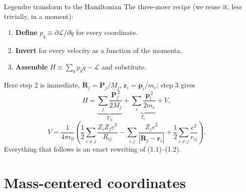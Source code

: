 \documentclass[aspectratio=169,10pt]{beamer}
\newcommand{\stagenum}{0}
\newcommand{\setstage}[1]{\renewcommand{\stagenum}{#1}}
\begin{document}
\begin{frame}{Legendre transform to the Hamiltonian}
\setstage{1}
The three-move recipe (we reuse it, less trivially, in a moment):
\begin{enumerate}
  \item \textbf{Define} $p_q\equiv\partial \mathcal L/\partial\dot q$ for every coordinate.
  \item \textbf{Invert} for every velocity as a function of the momenta.
  \item \textbf{Assemble} $H\equiv\sum_qp_q\dot q-\mathcal L$ and substitute.
\end{enumerate}
Here step 2 is immediate, $\dot{\mathbf R}_j=\mathbf P_j/M_j$, $\dot{\mathbf r}_i=\mathbf p_i/m_e$; step 3 gives
\begin{equation*}
H = \underbrace{\sum_{j}\frac{\mathbf{P}_j^{\,2}}{2M_j}}_{T_N} + \underbrace{\sum_{i}\frac{\mathbf{p}_i^{\,2}}{2m_e}}_{T_e} + V, \tag{1.1}
\end{equation*}
\begin{equation*}
V = \frac{1}{4\pi\epsilon_0}\left(\frac12\sum_{i\ne j}\frac{Z_i Z_j e^2}{R_{ij}} - \sum_{i,j}\frac{Z_j e^2}{|\mathbf{R}_j-\mathbf{r}_i|} + \frac12\sum_{i\ne j}\frac{e^2}{r_{ij}}\right). \tag{1.2}
\end{equation*}
\vspace{0.5ex}
\centering\footnotesize Everything that follows is an exact rewriting of (1.1)--(1.2).
\end{frame}

\setstage{1}
\section{Mass-centered coordinates}
\end{document}
